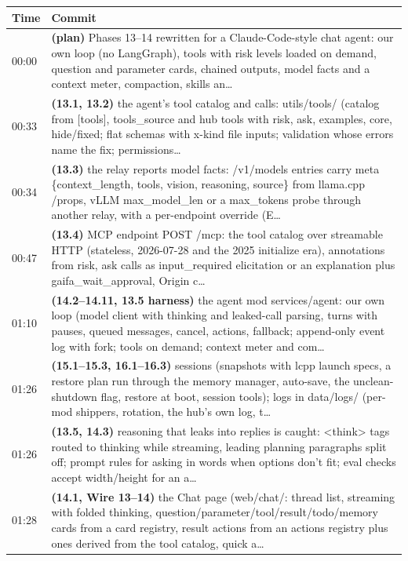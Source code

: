 \begin{longtable}{@{}l>{\raggedright\arraybackslash}p{14.2cm}@{}}
\toprule
Time & Commit \\
\midrule\endhead
00:00 & \textbf{(plan)} Phases 13--14 rewritten for a Claude-Code-style chat agent: our own loop (no LangGraph), tools with risk levels loaded on demand, question and parameter cards, chained outputs, model facts and a context meter, compaction, skills an… \\
00:33 & \textbf{(13.1, 13.2)} the agent's tool catalog and calls: utils/tools/ (catalog from [tools], tools\_source and hub tools with risk, ask, examples, core, hide/fixed; flat schemas with x-kind file inputs; validation whose errors name the fix; permissions… \\
00:34 & \textbf{(13.3)} the relay reports model facts: /v1/models entries carry meta \{context\_length, tools, vision, reasoning, source\} from llama.cpp /props, vLLM max\_model\_len or a max\_tokens probe through another relay, with a per-endpoint override (E… \\
00:47 & \textbf{(13.4)} MCP endpoint POST /mcp: the tool catalog over streamable HTTP (stateless, 2026-07-28 and the 2025 initialize era), annotations from risk, ask calls as input\_required elicitation or an explanation plus gaifa\_wait\_approval, Origin c… \\
01:10 & \textbf{(14.2--14.11, 13.5 harness)} the agent mod services/agent: our own loop (model client with thinking and leaked-call parsing, turns with pauses, queued messages, cancel, actions, fallback; append-only event log with fork; tools on demand; context meter and com… \\
01:26 & \textbf{(15.1--15.3, 16.1--16.3)} sessions (snapshots with lcpp launch specs, a restore plan run through the memory manager, auto-save, the unclean-shutdown flag, restore at boot, session tools); logs in data/logs/ (per-mod shippers, rotation, the hub's own log, t… \\
01:26 & \textbf{(13.5, 14.3)} reasoning that leaks into replies is caught: <think> tags routed to thinking while streaming, leading planning paragraphs split off; prompt rules for asking in words when options don't fit; eval checks accept width/height for an a… \\
01:28 & \textbf{(14.1, Wire 13--14)} the Chat page (web/chat/: thread list, streaming with folded thinking, question/parameter/tool/result/todo/memory cards from a card registry, result actions from an actions registry plus ones derived from the tool catalog, quick a… \\

\end{longtable}
